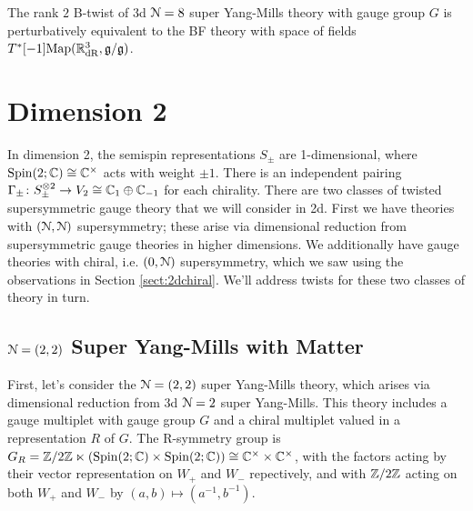 \documentclass[10pt, oneside]{article}
\begin{document}
\begin{theorem} \label{3d_8_B_twist_thm}
The rank $2$ B-twist of 3d $\mathcal{N}=8$ super Yang-Mills theory with gauge group $G$ is perturbatively equivalent to the BF theory with space of fields $T^*[-1]\mathrm{Map}(\mathbb R^3_{\mathrm{dR}}, \mathfrak{g}/\mathfrak{g})$. %
\end{theorem}

\section{Dimension 2}
In dimension 2, the semispin representations $S_\pm$ are 1-dimensional, where $\mathrm{Spin}(2;\mathbb C) \cong \mathbb C^\times$ acts with weight $\pm 1$.  There is an independent pairing $\Gamma_\pm \colon S_\pm^{\otimes 2} \to V_2 \cong \mathbb C_1 \oplus \mathbb C_{-1}$ for each chirality.  There are two classes of twisted supersymmetric gauge theory that we will consider in 2d.  First we have theories with $(\mathcal{N}, \mathcal{N})$ supersymmetry; these arise via dimensional reduction from supersymmetric gauge theories in higher dimensions.  We additionally have gauge theories with chiral, i.e. $(0,\mathcal{N})$ supersymmetry, which we saw using the observations in Section \ref{sect:2dchiral}.  We'll address twists for these two classes of theory in turn.

\subsection{\texorpdfstring{$\mathcal N=(2,2)$}{N=(2,2)} Super Yang-Mills with Matter} \label{sect:2d(2,2)}
First, let's consider the $\mathcal{N}=(2,2)$ super Yang-Mills theory, which arises via dimensional reduction from 3d $\mathcal{N}=2$ super Yang-Mills.  This theory includes a gauge multiplet with gauge group $G$ and a chiral multiplet valued in a representation $R$ of $G$.  The R-symmetry group is $G_R = \mathbb Z/2\mathbb Z \ltimes (\mathrm{Spin}(2;\mathbb C) \times \mathrm{Spin}(2;\mathbb C)) \cong \mathbb C^\times \times \mathbb C^\times$, with the factors acting by their vector representation on $W_+$ and $W_-$ repectively, and with $\mathbb Z/2\mathbb Z$ acting on both $W_+$ and $W_-$ by $(a,b) \mapsto (a^{-1}, b^{-1})$.

\vspace{-10pt}
\end{document}
